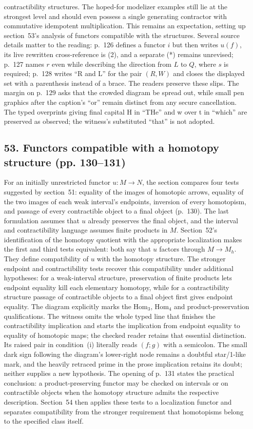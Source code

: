contractibility structures. The hoped-for modelizer examples still lie at the strongest level and should even possess a single generating contractor with commutative idempotent multiplication. This remains an expectation, setting up section~53's analysis of functors compatible with the structures. Several source details matter to the reading: p.~126 defines a functor $i$ but then writes $u(f)$, its live rewritten cross-reference is (2), and a separate (*) remains unrevised; p.~127 names $r$ even while describing the direction from $L$ to $Q$, where $s$ is required; p.~128 writes ``R and L'' for the pair $(R,W)$ and closes the displayed set with a parenthesis instead of a brace. The readers preserve these slips. The margin on p.~129 asks that the crowded diagram be spread out, while small pen graphics after the caption's ``or'' remain distinct from any secure cancellation. The typed overprints giving final capital H in ``THe'' and w over t in ``which'' are preserved as observed; the witness's substituted ``that'' is not adopted.

\subsection*{53. Functors compatible with a homotopy structure (pp. 130--131)}
For an initially unrestricted functor $u:M\to N$, the section compares four tests suggested by section~51: equality of the images of homotopic arrows, equality of the two images of each weak interval's endpoints, inversion of every homotopism, and passage of every contractible object to a final object (p.~130). The last formulation assumes that $u$ already preserves the final object, and the interval and contractibility language assumes finite products in $M$. Section~52's identification of the homotopy quotient with the appropriate localization makes the first and third tests equivalent: both say that $u$ factors through $M\to M_h$. They define compatibility of $u$ with the homotopy structure. The stronger endpoint and contractibility tests recover this compatibility under additional hypotheses: for a weak-interval structure, preservation of finite products lets endpoint equality kill each elementary homotopy, while for a contractibility structure passage of contractible objects to a final object first gives endpoint equality. The diagram explicitly marks the $\mathrm{Hom}_3$, $\mathrm{Hom}_4$ and product-preservation qualifications. The witness omits the whole typed line that finishes the contractibility implication and starts the implication from endpoint equality to equality of homotopic maps; the checked reader retains that essential distinction. Its raised pair in condition~(i) literally reads $(f;g)$ with a semicolon. The small dark sign following the diagram's lower-right node remains a doubtful star/1-like mark, and the heavily retraced prime in the prose implication retains its doubt; neither supplies a new hypothesis. The opening of p.~131 states the practical conclusion: a product-preserving functor may be checked on intervals or on contractible objects when the homotopy structure admits the respective description. Section~54 then applies these tests to a localization functor and separates compatibility from the stronger requirement that homotopisms belong to the specified class itself.

